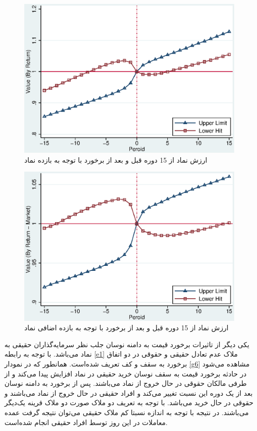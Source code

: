 \documentclass[12pt]{article}
\begin{document}
\begin{figure}[htbp]
\centering
\includegraphics[width=0.8\columnwidth]{R.eps}
\caption{ارزش نماد از 15 دوره قبل  و بعد از برخورد  با توجه به بازده نماد }
\label{g4}
\end{figure}

\begin{figure}[htbp]
\centering
\includegraphics[width=0.8\columnwidth]{ER.eps}
\caption{ارزش نماد از 15 دوره قبل  و بعد از برخورد با توجه به بازده اضافی نماد }
\label{g5}
\end{figure}


یکی دیگر از تاثیرات برخورد قیمت به دامنه نوسان جلب نظر سرمایه‌گذاران حقیقی به نماد می‌باشد. با توجه به رابطه 
\ref{e1}
 ملاک عدم تعادل حقیقی و حقوقی 
در دو اتفاق برخورد به سقف و کف تعریف شده‌است.
 همانطور که در نمودار  
 \ref{g6}
 مشاهده می‌شود در حادثه برخورد قیمت به سقف نوسان خرید حقیقی در نماد افزایش پیدا می‌کند و از طرفی مالکان حقوقی در حال خروج از نماد می‌باشند. پس از برخورد به دامنه نوسان بعد از یک دوره این نسبت تغییر می‌کند و افراد حقیقی در حال خروج از نماد می‌باشند و حقوقی در حال خرید می‌باشد. با توجه به تعریف دو ملاک صورت دو ملاک قرینه یک‌دیگر می‌باشند. در نتیجه با توجه به اندازه نسبتا کم ملاک حقیقی می‌توان نتیجه گرفت عمده معاملات در این روز توسط افراد حقیقی انجام شده‌است. 
 
\end{document}
